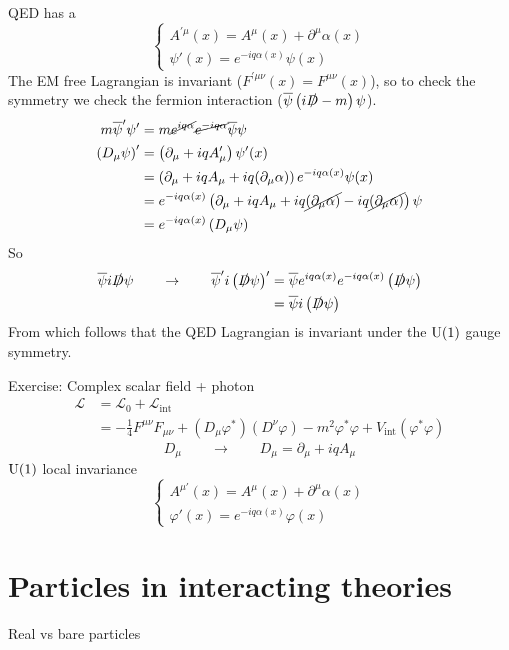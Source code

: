 QED has a 
\[ \begin{cases}
A^{\prime\mu}(x) = A^\mu(x) + \partial^\mu\alpha(x) \\ \psi'(x) = e^{-iq\alpha(x)}\psi(x)
\end{cases} \]
The EM free Lagrangian is invariant ($F^{\prime\mu\nu}(x)=F^{\mu\nu}(x)$), so to check the symmetry we check the fermion interaction ($\overline{\psi} \left(i\slashed{D}-m\right)\psi$).
\begin{align*}
m\overline{\psi}'\psi' &= m \cancel{e^{iq\alpha}}\cancel{e^{-iq\alpha}}\overline{\psi}\psi \\
\left(D_\mu\psi\right)' &= \left(\partial_\mu+iqA'_\mu\right)\psi'(x) \\
&= \left(\partial_\mu + iqA_\mu + iq(\partial_\mu\alpha)\right)e^{-iq\alpha(x)}\psi(x) \\
&= e^{-iq\alpha(x)} \left(\partial_\mu + iqA_\mu + iq \cancel{(\partial_\mu\alpha)} - iq \cancel{(\partial_\mu\alpha)}\right)\psi \\
&= e^{-iq\alpha(x)} \left(D_\mu\psi\right)
\end{align*}
So
\begin{align*}
\overline{\psi}i\slashed{D}\psi \qquad \to \qquad \overline{\psi}'i\left(\slashed{D}\psi\right)' &= \overline{\psi}e^{iq\alpha(x)}e^{-iq\alpha(x)}\left(\slashed{D}\psi\right) \\
&= \overline{\psi}i \left(\slashed{D}\psi\right)
\end{align*}
From which follows that the QED Lagrangian is invariant under the $\operatorname{U}(1)$ gauge symmetry.

\begin{example}
Exercise: Complex scalar field + photon
\begin{align*}
\mathcal{L}  &= \mathcal{L} _0 + \mathcal{L} _\text{int} \\
&= - \frac{1}{4}F^{\mu\nu}F_{\mu\nu} + \left(D_\mu\varphi^*\right)\left(D^\nu\varphi\right) - m^2\varphi^*\varphi + V_\text{int}(\varphi^*\varphi)
\end{align*}
\[ D_\mu \qquad \to \qquad D_\mu = \partial_\mu + iqA_\mu \]
$\operatorname{U}(1)$ local  invariance
\[ \begin{cases}
A^{\mu\prime}(x) = A^\mu(x) + \partial^\mu\alpha(x) \\
\varphi'(x) = e^{-iq\alpha(x)}\varphi(x)
\end{cases} \]
\end{example}

\section{Particles in interacting theories}
Real vs bare particles

